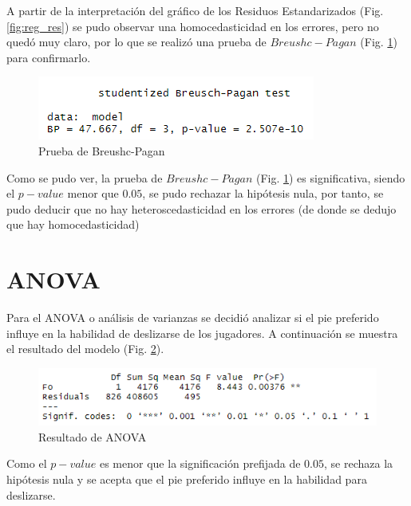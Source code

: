 \documentclass[a4paper,10pt,twocolumn]{article}
\begin{document}
A partir de la interpretación del gráfico de los Residuos Estandarizados (Fig. \ref{fig:reg_res}) se pudo observar una homocedasticidad en los errores, pero no quedó muy claro, por lo que se realizó una prueba de $Breushc-Pagan$ (Fig. \ref{fig:reg_bptest}) para confirmarlo.

\begin{figure}[htb]%
	\begin{center}
		\includegraphics[width=\linewidth]{reg_bptest}
	\end{center}
	\caption{Prueba de Breushc-Pagan \label{fig:reg_bptest}}%
\end{figure}

Como se pudo ver, la prueba de $Breushc-Pagan$ (Fig. \ref{fig:reg_bptest}) es significativa, siendo el $p-value$ menor que $0.05$, se pudo rechazar la hipótesis nula, por tanto, se pudo deducir que no hay heteroscedasticidad en los errores (de donde se dedujo que hay homocedasticidad)

\section{ANOVA}\label{sec:anova}

Para el ANOVA o análisis de varianzas se decidió analizar si el pie preferido influye en la habilidad de deslizarse de los jugadores. A continuación se muestra el resultado del modelo (Fig. \ref{fig:anova_sum}).

\begin{figure}[htb]%
	\begin{center}
		\includegraphics[width=\linewidth]{anova_sum}
	\end{center}
	\caption{Resultado de ANOVA \label{fig:anova_sum}}%
\end{figure}

Como el $p-value$ es menor que la significación prefijada de $0.05$, se rechaza la hipótesis nula y se acepta que el pie preferido influye en la habilidad para deslizarse.
\end{document}
